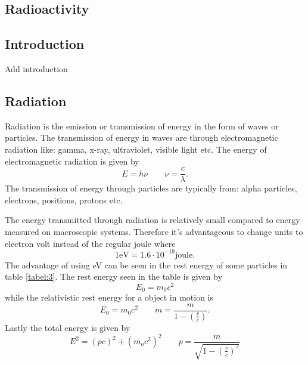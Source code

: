 \documentclass[jmp, amsmath, amssymb, reprint]{article}
\numberwithin{equation}{section}
\newcommand{\lp}{\left(}
\newcommand{\rp}{\right)}
\begin{document}
\begin{multicols}{2}
\clearpage

\section{Radioactivity}

\subsection*{Introduction}

Add introduction

\subsection{Radiation}

Radiation is the emission or transmission of energy in the form of waves or particles. The transmission of energy in waves are through electromagnetic radiation like: gamma, x-ray, ultraviolet, visible light etc. The energy of electromagnetic radiation is given by
\begin{equation}
E=h\nu \qquad \nu = \frac{c}{\lambda}.
\end{equation}
The transmission of energy through particles are typically from: alpha particles, electrons, positions, protons etc.

The energy transmitted through radiation is relatively small compared to energy measured on macroscopic systems. Therefore it's advantageous to change units to electron volt instead of the regular joule where
\begin{equation}
1\text{eV}=1.6\cdot 10^{-19}\text{joule}.
\end{equation}
The advantage of using eV can be seen in the rest energy of some particles in table \ref{tabel:3}. The rest energy seen in the table is given by
\begin{equation}
E_0=m_0c^2
\end{equation}
while the relativistic rest energy for a object in motion is
\begin{equation}
E_0=m_0c^2\qquad m=\dfrac{m}{1-\lp\frac{v}{c}\rp}.
\end{equation}
Lastly the total energy is given by
\begin{equation}
E^2=\lp pc\rp^2 + \lp m_oc^2\rp^2\qquad p=\frac{m}{\sqrt{1-\lp\frac{v}{c}\rp^2}}
\end{equation}


\end{multicols}
\end{document}
